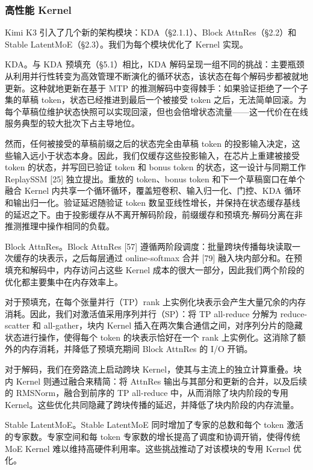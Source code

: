 \documentclass[
  10
]{article}
\begin{document}
\subsubsection{高性能 Kernel}\label{high-performance-kernels}

Kimi K3 引入了几个新的架构模块：KDA（§2.1.1）、Block AttnRes（§2.2）和 Stable LatentMoE（§2.3）。我们为每个模块优化了 Kernel 实现。

KDA。与 KDA 预填充（§5.1）相比，KDA 解码呈现一组不同的挑战：主要瓶颈从利用并行性转变为高效管理不断演化的循环状态，该状态在每个解码步都被就地更新。这种就地更新在基于 MTP 的推测解码中变得棘手：如果验证拒绝了一个子集的草稿 token，状态已经推进到最后一个被接受 token 之后，无法简单回滚。为每个草稿位维护状态快照可以实现回滚，但也会倍增状态流量——这一代价在在线服务典型的较大批次下占主导地位。

然而，任何被接受的草稿前缀之后的状态完全由草稿 token 的投影输入决定，这些输入远小于状态本身。因此，我们仅缓存这些投影输入，在芯片上重建被接受 token 的状态，并写回已验证 token 和 bonus token 的状态，这一设计与同期工作 ReplaySSM {[}25{]} 独立提出。重放的 token、bonus token 和下一个草稿窗口在单个融合 Kernel 内共享一个循环循环，覆盖短卷积、输入归一化、门控、KDA 循环和输出归一化。验证延迟随验证 token 数呈亚线性增长，并保持在状态缓存基线的延迟之下。由于投影缓存从不离开解码阶段，前缀缓存和预填充-解码分离在非推测推理中操作相同的负载。

Block AttnRes。Block AttnRes {[}57{]} 遵循两阶段调度：批量跨块传播每块读取一次缓存的块表示，之后每层通过 online-softmax 合并 {[}79{]} 融入块内部分和。在预填充和解码中，内存访问占这些 Kernel 成本的很大一部分，因此我们两个阶段的优化都主要集中在内存效率上。

对于预填充，在每个张量并行（TP）rank 上实例化块表示会产生大量冗余的内存消耗。因此，我们对激活值采用序列并行（SP）：将 TP all-reduce 分解为 reduce-scatter 和 all-gather，块内 Kernel 插入在两次集合通信之间，对序列分片的隐藏状态进行操作，使得每个 token 的块表示恰好在一个 rank 上实例化。这消除了额外的内存消耗，并降低了预填充期间 Block AttnRes 的 I/O 开销。

对于解码，我们在旁路流上启动跨块 Kernel，使其与主流上的独立计算重叠。块内 Kernel 则通过融合来精简：将 AttnRes 输出与其部分和更新的合并，以及后续的 RMSNorm，融合到前序的 TP all-reduce 中，从而消除了块内阶段的专用 Kernel。这些优化共同隐藏了跨块传播的延迟，并降低了块内阶段的内存流量。

Stable LatentMoE。Stable LatentMoE 同时增加了专家的总数和每个 token 激活的专家数。专家空间和每 token 专家数的增长提高了调度和协调开销，使得传统 MoE Kernel 难以维持高硬件利用率。这些挑战推动了对该模块的专用 Kernel 优化。
\end{document}
